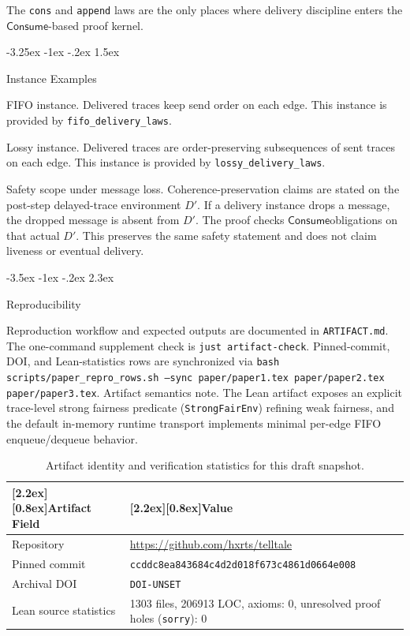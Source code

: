 \documentclass[a4paper,10pt,twocolumn,english]{article}
\makeatletter
\renewcommand{\section}{\@startsection{section}{1}{\z@}%
  {-3.5ex \@plus -1ex \@minus -.2ex}%
  {2.3ex}%
  {\raggedright\normalfont\large\bfseries}}
\renewcommand{\subsection}{\@startsection{subsection}{2}{\z@}%
  {-3.25ex \@plus -1ex \@minus -.2ex}%
  {1.5ex}%
  {\raggedright\normalfont\normalsize\bfseries}}
\numberwithin{equation}{section}
\theoremstyle{paperdef}
\theoremstyle{paperplain}
\theoremstyle{paperdef}
\theoremstyle{paperremark}
\newcommand{\thead}[1]{\textbf{\raisebox{0pt}[2.2ex][0.8ex]{#1}}}
\newcommand{\Consume}{\ensuremath{\mathsf{Consume}}}
\makeatother
\begin{document}
The \texttt{cons} and \texttt{append} laws are the only places where delivery
discipline enters the \Consume-based proof kernel.

\subsection{Instance Examples}

FIFO instance. Delivered traces keep send order on each edge. This instance is
provided by \nolinkurl{fifo_delivery_laws}.

Lossy instance. Delivered traces are order-preserving subsequences of sent traces
on each edge. This instance is provided by \nolinkurl{lossy_delivery_laws}.

Safety scope under message loss. Coherence-preservation claims are stated on the
post-step delayed-trace environment $D'$. If a delivery instance drops a message,
the dropped message is absent from $D'$. The proof checks \Consume obligations on
that actual $D'$. This preserves the same safety statement and does not claim
liveness or eventual delivery.

\section{Reproducibility}
\label{app:reproducibility}

Reproduction workflow and expected outputs are documented in
\texttt{ARTIFACT.md}. The one-command supplement check is
\texttt{just artifact-check}. Pinned-commit, DOI, and Lean-statistics rows are
synchronized via
\texttt{bash scripts/paper\_repro\_rows.sh --sync paper/paper1.tex paper/paper2.tex paper/paper3.tex}.
Artifact semantics note. The Lean artifact exposes an explicit trace-level
strong fairness predicate (\texttt{StrongFairEnv}) refining weak fairness, and
the default in-memory runtime transport implements minimal per-edge FIFO
enqueue/dequeue behavior.

\begin{table}[H]
	\centering
	\footnotesize
	\begin{tabularx}{\columnwidth}{@{}L{0.34\columnwidth}L{0.61\columnwidth}@{}}
		\toprule
		\thead{Artifact Field} & \thead{Value}                                                                             \\
		\midrule
		Repository             & \url{https://github.com/hxrts/telltale}                                                   \\
		Pinned commit & \texttt{ccddc8ea843684c4}\allowbreak\texttt{d2d018f673c4861d}\allowbreak\texttt{0664e008} \\
		Archival DOI & \texttt{DOI-UNSET} \\
		Lean source statistics & 1303 files, 206913 LOC, axioms: 0, unresolved proof holes (\texttt{sorry}): 0 \\
		\bottomrule
	\end{tabularx}
	\caption{Artifact identity and verification statistics for this draft snapshot.}
\end{table}
\end{document}
